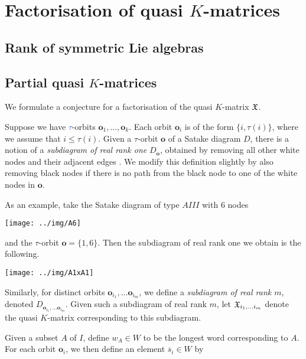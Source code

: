 \documentclass[a4 paper, 10pt]{article}
\newcommand{\newnotation}{\textcolor{RoyalBlue}}
\begin{document}
\section{Factorisation of quasi $K$-matrices}
\subsection{Rank of symmetric Lie algebras}
\subsection{Partial quasi $K$-matrices}

\noindent We formulate a conjecture for a factorisation of the quasi $K$-matrix \newnotation{$\mathfrak{X}$}. 


Suppose we have \newnotation{$\tau$}-orbits $\textbf{o}_1, \dots, \textbf{o}_k$. Each orbit $\textbf{o}_i$ is of the form $\{i, \tau(i) \}$, where we assume that $i \leq \tau(i)$. 
Given a $\tau$-orbit $\textbf{o}$ of a Satake diagram $D$, there is a notion of a \emph{subdiagram of real rank one} $D_{\textbf{o}}$, obtained by removing all other white nodes and their adjacent edges \cite[Definition 3.2]{a-BW16}. We modify this definition slightly by also removing black nodes if there is no path from the black node to one of the white nodes in $\textbf{o}$.


As an example, take the Satake diagram of type $AIII$ with $6$ nodes 

\begin{center}
\texttt{[image: ../img/A6]}
\end{center}

\noindent and the $\tau$-orbit $\textbf{o} = \{ 1,6 \}$. Then the subdiagram of real rank one we obtain is the following.

\begin{center}
\texttt{[image: ../img/A1xA1]} 
\end{center}


\noindent Similarly, for distinct orbits $\textbf{o}_{i_1}, \dots \textbf{o}_{i_m}$, we define a \emph{subdiagram of real rank $m$}, denoted $D_{\textbf{o}_{i_1}, \dots \textbf{o}_{i_m}}$.
Given such a subdiagram of real rank $m$, let $\mathfrak{X}_{i_1, \dots i_m}$ denote the quasi $K$-matrix corresponding to this subdiagram.

Given a subset $A$ of $I$, define $w_A \in W$ to be the longest word corresponding to $A$.
For each orbit $\textbf{o}_i$, we then define an element $\overline{s}_i \in W$ by
\end{document}
